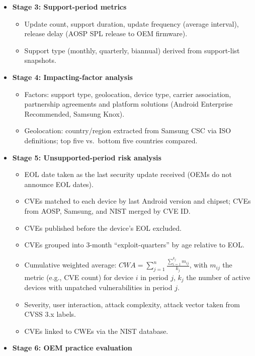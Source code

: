 \documentclass[11pt,a4paper]{article}
\begin{document}
\begin{enumerate}
\begin{itemize}[leftmargin=*,itemsep=1pt,topsep=2pt]
        \item \textbf{Stage 3: Support-period metrics}
        \begin{itemize}[itemsep=0pt]
            \item Update count, support duration, update frequency (average interval), release delay (AOSP SPL release to OEM firmware).
            \item Support type (monthly, quarterly, biannual) derived from support-list snapshots.
        \end{itemize}
        \item \textbf{Stage 4: Impacting-factor analysis}
        \begin{itemize}[itemsep=0pt]
            \item Factors: support type, geolocation, device type, carrier association, partnership agreements and platform solutions (Android Enterprise Recommended, Samsung Knox).
            \item Geolocation: country/region extracted from Samsung CSC via ISO definitions; top five vs.\ bottom five countries compared.
        \end{itemize}
        \item \textbf{Stage 5: Unsupported-period risk analysis}
        \begin{itemize}[itemsep=0pt]
            \item EOL date taken as the last security update received (OEMs do not announce EOL dates).
            \item CVEs matched to each device by last Android version and chipset; CVEs from AOSP, Samsung, and NIST merged by CVE ID.
            \item CVEs published before the device's EOL excluded.
            \item CVEs grouped into 3-month ``exploit-quarters'' by age relative to EOL.
            \item Cumulative weighted average: $CWA = \sum_{j=1}^{n} \frac{\sum_{i=1}^{k_j} m_{ij}}{k_j}$, with $m_{ij}$ the metric (e.g., CVE count) for device $i$ in period $j$, $k_j$ the number of active devices with unpatched vulnerabilities in period $j$.
            \item Severity, user interaction, attack complexity, attack vector taken from CVSS 3.x labels.
            \item CVEs linked to CWEs via the NIST database.
        \end{itemize}
        \item \textbf{Stage 6: OEM practice evaluation}

\end{itemize}
\end{enumerate}
\end{document}
